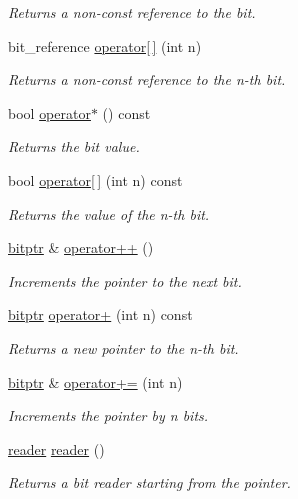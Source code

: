 \begin{DoxyCompactItemize}
\begin{DoxyCompactList}\small\item\em Returns a non-\/const reference to the bit. \end{DoxyCompactList}\item 
bit\+\_\+reference \mbox{\hyperlink{classirk_1_1bitptr_a1df6b87e20b41de54fd6d582263a905d}{operator\mbox{[}$\,$\mbox{]}}} (int n)
\begin{DoxyCompactList}\small\item\em Returns a non-\/const reference to the {\ttfamily n}-\/th bit. \end{DoxyCompactList}\item 
bool \mbox{\hyperlink{classirk_1_1bitptr_a4cb8f7ff26e561a9348f79082ad6af35}{operator$\ast$}} () const
\begin{DoxyCompactList}\small\item\em Returns the bit value. \end{DoxyCompactList}\item 
bool \mbox{\hyperlink{classirk_1_1bitptr_ae7ed619d650d1982a2510ca8cdd997c1}{operator\mbox{[}$\,$\mbox{]}}} (int n) const
\begin{DoxyCompactList}\small\item\em Returns the value of the {\ttfamily n}-\/th bit. \end{DoxyCompactList}\item 
\mbox{\hyperlink{classirk_1_1bitptr}{bitptr}} \& \mbox{\hyperlink{classirk_1_1bitptr_abb1d7cadd88cb17c9d672a9653d6cbf8}{operator++}} ()
\begin{DoxyCompactList}\small\item\em Increments the pointer to the next bit. \end{DoxyCompactList}\item 
\mbox{\hyperlink{classirk_1_1bitptr}{bitptr}} \mbox{\hyperlink{classirk_1_1bitptr_ad382cd01b956b2b37d62990ca57de170}{operator+}} (int n) const
\begin{DoxyCompactList}\small\item\em Returns a new pointer to the {\ttfamily n}-\/th bit. \end{DoxyCompactList}\item 
\mbox{\hyperlink{classirk_1_1bitptr}{bitptr}} \& \mbox{\hyperlink{classirk_1_1bitptr_a9fcc393a8789c4500391ff3ff2a9fff7}{operator+=}} (int n)
\begin{DoxyCompactList}\small\item\em Increments the pointer by {\ttfamily n} bits. \end{DoxyCompactList}\item 
\mbox{\hyperlink{structirk_1_1bitptr_1_1reader}{reader}} \mbox{\hyperlink{classirk_1_1bitptr_a4505dc024807e2b041ffdc910fae1189}{reader}} ()
\begin{DoxyCompactList}\small\item\em Returns a bit reader starting from the pointer. \end{DoxyCompactList}\end{DoxyCompactItemize}


